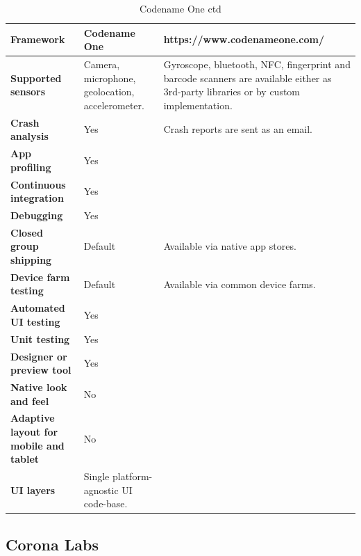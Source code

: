 \documentclass[english,master,public,dept460,male,cpdeclaration,oneside]{diploma}
\begin{document}
\begin{table}[!h]
	\centering
	\caption{Codename One ctd}
	\begin{tabular}{p{} | p{} | p{}}
		\toprule		
		\textbf{Framework} & \textbf{Codename One} & https://www.codenameone.com/ \\
		\midrule
		\textbf{Supported sensors} & Camera, microphone, geolocation, accelerometer. & Gyroscope, bluetooth, NFC, fingerprint and barcode scanners are available either as 3rd-party libraries or by custom implementation. \\			
		\midrule
		\textbf{Crash analysis} & Yes & Crash reports are sent as an email. \\			
		\midrule
		\textbf{App profiling} & Yes & \\			
		\midrule
		\textbf{Continuous integration} & Yes & \\			
		\midrule
		\textbf{Debugging} & Yes & \\			
		\midrule
		\textbf{Closed group shipping} & Default & Available via native app stores. \\			
		\midrule
		\textbf{Device farm testing} & Default & Available via common device farms. \\			
		\midrule
		\textbf{Automated UI testing} & Yes & \\			
		\midrule
		\textbf{Unit testing} & Yes & \\			
		\midrule
		\textbf{Designer or preview tool} & Yes & \\			
		\midrule
		\textbf{Native look and feel} & No & \\			
		\midrule
		\textbf{Adaptive layout for mobile and tablet} & No & \\			
		\midrule		
		\textbf{UI layers} & Single platform-agnostic UI code-base. &  \\			
		\midrule
	\end{tabular}
\end{table}

\clearpage
\subsection{Corona Labs}
\end{document}
